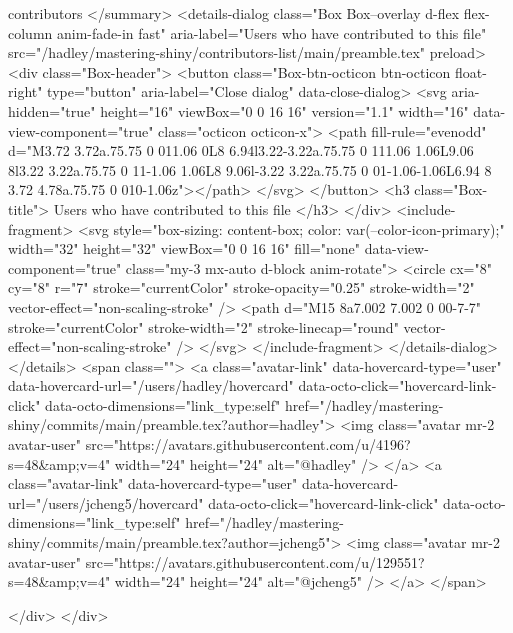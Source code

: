         contributors
      </summary>
      <details-dialog
        class="Box Box--overlay d-flex flex-column anim-fade-in fast"
        aria-label="Users who have contributed to this file"
        src="/hadley/mastering-shiny/contributors-list/main/preamble.tex" preload>
        <div class="Box-header">
          <button class="Box-btn-octicon btn-octicon float-right" type="button" aria-label="Close dialog" data-close-dialog>
            <svg aria-hidden="true" height="16" viewBox="0 0 16 16" version="1.1" width="16" data-view-component="true" class="octicon octicon-x">
    <path fill-rule="evenodd" d="M3.72 3.72a.75.75 0 011.06 0L8 6.94l3.22-3.22a.75.75 0 111.06 1.06L9.06 8l3.22 3.22a.75.75 0 11-1.06 1.06L8 9.06l-3.22 3.22a.75.75 0 01-1.06-1.06L6.94 8 3.72 4.78a.75.75 0 010-1.06z"></path>
</svg>
          </button>
          <h3 class="Box-title">
            Users who have contributed to this file
          </h3>
        </div>
        <include-fragment>
          <svg style="box-sizing: content-box; color: var(--color-icon-primary);" width="32" height="32" viewBox="0 0 16 16" fill="none" data-view-component="true" class="my-3 mx-auto d-block anim-rotate">
  <circle cx="8" cy="8" r="7" stroke="currentColor" stroke-opacity="0.25" stroke-width="2" vector-effect="non-scaling-stroke" />
  <path d="M15 8a7.002 7.002 0 00-7-7" stroke="currentColor" stroke-width="2" stroke-linecap="round" vector-effect="non-scaling-stroke" />
</svg>
        </include-fragment>
      </details-dialog>
    </details>
      <span class="">
    <a class="avatar-link" data-hovercard-type="user" data-hovercard-url="/users/hadley/hovercard" data-octo-click="hovercard-link-click" data-octo-dimensions="link_type:self" href="/hadley/mastering-shiny/commits/main/preamble.tex?author=hadley">
      <img class="avatar mr-2 avatar-user" src="https://avatars.githubusercontent.com/u/4196?s=48&amp;v=4" width="24" height="24" alt="@hadley" /> 
</a>    <a class="avatar-link" data-hovercard-type="user" data-hovercard-url="/users/jcheng5/hovercard" data-octo-click="hovercard-link-click" data-octo-dimensions="link_type:self" href="/hadley/mastering-shiny/commits/main/preamble.tex?author=jcheng5">
      <img class="avatar mr-2 avatar-user" src="https://avatars.githubusercontent.com/u/129551?s=48&amp;v=4" width="24" height="24" alt="@jcheng5" /> 
</a>
</span>

  </div>
</div>








